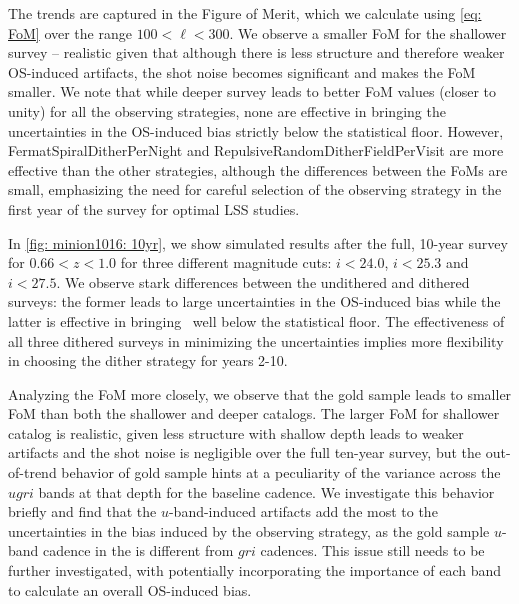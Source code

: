 The trends are captured in the Figure of Merit, which we calculate using \autoref{eq: FoM} over the range $100<\ell<300$. We observe a smaller FoM for the shallower survey -- realistic given that although there is less structure and therefore weaker OS-induced artifacts, the shot noise becomes significant and makes the FoM smaller. We note that while deeper survey leads to better FoM values (closer to unity) for all the observing strategies, none are effective in bringing the uncertainties in the OS-induced bias strictly below the statistical floor. However, FermatSpiralDitherPerNight and RepulsiveRandomDitherFieldPerVisit  are more effective than the other strategies, although the differences between the FoMs are small, emphasizing the need for careful selection of the observing strategy in the first year of the survey for optimal LSS studies.

In \autoref{fig: minion1016: 10yr}, we show simulated results after the full, 10-year survey for $0.66<z<1.0$ for three different magnitude cuts: $i<24.0$, $i<25.3$ and $i<27.5$. We observe stark differences between the undithered and dithered surveys: the former leads to large uncertainties in the OS-induced bias while the latter is effective in bringing \sigmaOS\ well below the statistical floor. The effectiveness of all three dithered surveys in minimizing the uncertainties implies more flexibility in choosing the dither strategy for years 2-10.

Analyzing the FoM more closely, we observe that the gold sample leads to smaller FoM than both the shallower and deeper catalogs. The larger FoM for shallower catalog is realistic, given less structure with shallow depth leads to weaker artifacts and the shot noise is negligible over the full ten-year survey, but the out-of-trend behavior of gold sample hints at a peculiarity of the variance across the $ugri$ bands at that depth for the baseline cadence. We investigate this behavior briefly and find that the $u$-band-induced artifacts add the most to the uncertainties in the bias induced by the observing strategy, as the gold sample $u$-band cadence in the  is different from $gri$ cadences. This issue still needs to be further investigated, with potentially incorporating the importance of each band to calculate an overall OS-induced bias.

